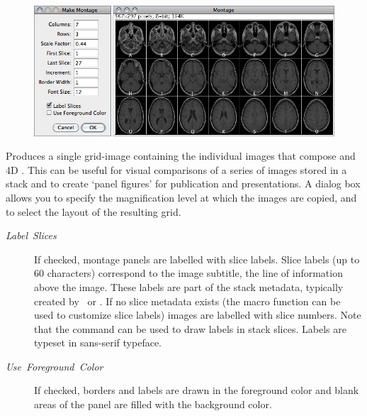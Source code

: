\begin{figure}
\noindent \centering{}\includegraphics[width=1\columnwidth]{images/MakeMontage}
\end{figure}
Produces
a single grid-image containing the individual images that compose
 and 4D .
This can be useful for visual comparisons of a series of images stored
in a stack and to create `panel figures' for publication and presentations.
A dialog box allows you to specify the magnification level at which
the images are copied, and to select the layout of the resulting grid.
\begin{description}
\item [{\emph{Label\ Slices}}] If checked, montage panels are labelled
with slice labels. Slice labels (up to 60 characters) correspond to
the image subtitle, the line of information above the image. These
labels are part of the stack metadata, typically created by \ or
. If
no slice metadata exists (the 
macro function can be used to customize slice labels) images are labelled
with slice numbers. Note that the 
command can be used to draw labels in stack slices. Labels are typeset
in sans-serif typeface.
\item [{\emph{Use\ Foreground\ Color}}] If checked, borders and labels
are drawn in the foreground color and blank areas of the panel are
filled with the background color. 
\end{description}



